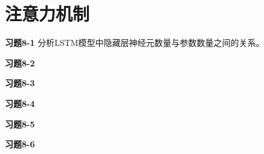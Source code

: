 \section{注意力机制}

\noindent\textbf{习题8-1} 分析LSTM模型中隐藏层神经元数量与参数数量之间的关系。

\noindent\textbf{习题8-2}

\noindent\textbf{习题8-3}

\noindent\textbf{习题8-4}

\noindent\textbf{习题8-5}

\noindent\textbf{习题8-6}
